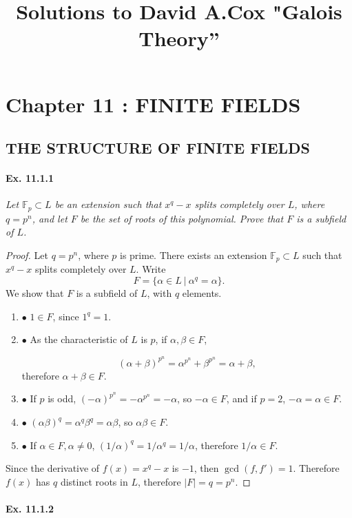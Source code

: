 \documentclass[11pt,a4paper]{article}
\title{Solutions to David A.Cox  "Galois Theory''}
\newcommand{\be} {\begin{enumerate}}
\newcommand{\ee} {\end{enumerate}}
\newcommand{\F}{\mathbb{F}}
\begin{document}
\section{Chapter 11 : FINITE FIELDS}

\subsection{THE STRUCTURE OF FINITE FIELDS}
\paragraph{Ex. 11.1.1}

{\it Let $\F_p \subset L$ be an extension such that $x^q-x$ splits completely over $L$, where $q=p^n$, and let $F$ be the set of roots of this polynomial. Prove that $F$ is a subfield of $L$.
}

\begin{proof}
Let $q=p^n$, where $p$ is prime. There exists an extension $\F_p \subset L$ such that $x^q-x$ splits completely over $L$. Write
$$F = \{\alpha \in L \ \vert \ \alpha^q=\alpha\}.$$
We show that $F$ is a subfield of $L$, with $q$ elements.
\be
\item[$\bullet$] $1\in F$, since  $1^q=1$.

\item[$\bullet$]  As the characteristic of $L$ is $p$, if $\alpha,\beta \in F$,

$$(\alpha + \beta)^{p^n} = \alpha^{p^n}+\beta^{p^n} = \alpha+\beta,$$ therefore $\alpha+\beta \in F$.

\item[$\bullet$]  If $p$ is odd, $(-\alpha)^{p^n} = -\alpha^{p^n} = -\alpha$, so $-\alpha \in F$, and if $p=2$, $-\alpha = \alpha \in F$.

\item[$\bullet$]  $(\alpha \beta)^q = \alpha^q \beta^q = \alpha \beta$, so $\alpha \beta \in F$.

\item[$\bullet$]  If $\alpha \in F, \alpha \neq 0$, $(1/\alpha)^q = 1/ \alpha^q = 1 /\alpha$, therefore $1/\alpha \in F$.
\ee

Since the derivative of $f(x) = x^q-x$ is $-1$, then $\gcd(f,f')=1$. Therefore $f(x)$ has $q$ distinct roots in $L$, therefore $\vert F \vert = q = p^n$.
\end{proof}

\paragraph{Ex. 11.1.2}
\end{document}
